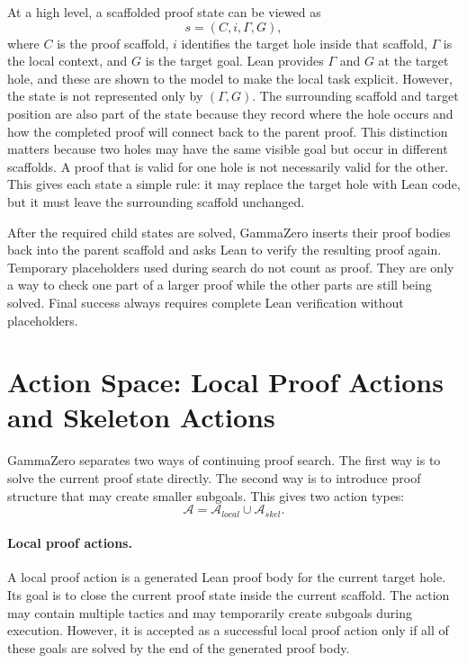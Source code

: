 At a high level, a scaffolded proof state can be viewed as
\[
s = (C, i, \Gamma, G),
\]
where \(C\) is the proof scaffold, \(i\) identifies the target hole inside that scaffold, \(\Gamma\) is the local context, and \(G\) is the target goal. Lean provides \(\Gamma\) and \(G\) at the target hole, and these are shown to the model to make the local task explicit. However, the state is not represented only by \((\Gamma, G)\). The surrounding scaffold and target position are also part of the state because they record where the hole occurs and how the completed proof will connect back to the parent proof.
This distinction matters because two holes may have the same visible goal but occur in different scaffolds. A proof that is valid for one hole is not necessarily valid for the other.
This gives each state a simple rule: it may replace the target hole with Lean code, but it must leave the surrounding scaffold unchanged.

After the required child states are solved, GammaZero inserts their proof bodies back into the parent scaffold and asks Lean to verify the resulting proof again. Temporary placeholders used during search do not count as proof. They are only a way to check one part of a larger proof while the other parts are still being solved. Final success always requires complete Lean verification without placeholders.

\section{Action Space: Local Proof Actions and Skeleton Actions}

GammaZero separates two ways of continuing proof search. The first way is to solve the current proof state directly. The second way is to introduce proof structure that may create smaller subgoals. This gives two action types:
\[
\mathcal{A} = \mathcal{A}_{local} \cup \mathcal{A}_{skel}.
\]

\paragraph{Local proof actions.}
A local proof action is a generated Lean proof body for the current target hole. Its goal is to close the current proof state inside the current scaffold. The action may contain multiple tactics and may temporarily create subgoals during execution. However, it is accepted as a successful local proof action only if all of these goals are solved by the end of the generated proof body.

